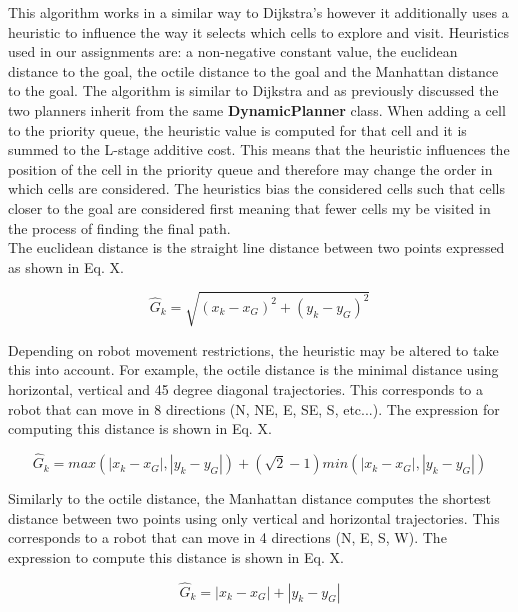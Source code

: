 \documentclass[a4paper,12pt]{article}
\begin{document}
				This algorithm works in a similar way to Dijkstra’s however it additionally uses a heuristic to influence the way it selects which cells to explore and visit. Heuristics used in our assignments are: a non-negative constant value, the euclidean distance to the goal, the octile distance to the goal and the Manhattan distance to the goal. The algorithm is similar to Dijkstra and as previously discussed the two planners inherit from the same \textbf{DynamicPlanner} class. When adding a cell to the priority queue, the heuristic value is computed for that cell and it is summed to the L-stage additive cost. This means that the heuristic influences the position of the cell in the priority queue and therefore may change the order in which cells are considered. The heuristics bias the considered cells such that cells closer to the goal are considered first meaning that fewer cells my be visited in the process of finding the final path.
				\\
				The euclidean distance is the straight line distance between two points expressed as shown in Eq. X. 
				
				\begin{equation}
					\hat{G}_{k} = \sqrt{(x_k-x_G)^2+(y_k-y_G)^2}
				\end{equation}
				
				Depending on robot movement restrictions, the heuristic may be altered to take this into account. For example, the octile distance is the minimal distance using horizontal, vertical and 45 degree diagonal trajectories. This corresponds to a robot that can move in 8 directions (N, NE, E, SE, S, etc...). The expression for computing this distance is shown in Eq. X.
				
				\begin{equation}
				\hat{G}_{k} = max(|x_k-x_G|,|y_k-y_G|) + (\sqrt{2}-1)min(|x_k-x_G|,|y_k-y_G|)
				\end{equation}
				
				Similarly to the octile distance, the Manhattan distance computes the shortest distance between two points using only vertical and horizontal trajectories. This corresponds to a robot that can move in 4 directions (N, E, S, W). The expression to compute this distance is shown in Eq. X. 
				
				\begin{equation}
				\hat{G}_{k} = |x_k-x_G|+|y_k-y_G|
				\end{equation}
				
\end{document}

